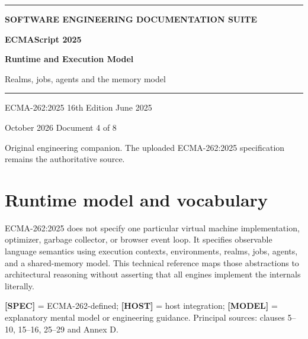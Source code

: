 \documentclass[11pt,letterpaper]{article}
\begin{document}
\hypersetup{pageanchor=false}%
\begin{titlepage}
\thispagestyle{empty}
\vspace*{2.8cm}
{\color{Gold}\rule{18mm}{3pt}}\par\vspace{18mm}
{\sffamily\Large\bfseries\color{Teal} SOFTWARE ENGINEERING DOCUMENTATION SUITE}\par
\vspace{8mm}
{\sffamily\huge\bfseries\color{DeepNavy} ECMAScript 2025 }\par
\vspace{4mm}
{\sffamily\fontsize{24}{29}\selectfont\bfseries\color{DeepNavy} Runtime and Execution Model }\par
\vspace{10mm}
{\large\color{Slate} Realms, jobs, agents and the memory model }\par
\vspace{16mm}
{\color{Teal}\rule{\textwidth}{0.8pt}}\par
\vfill
{\sffamily\color{Slate}\large ECMA-262:2025 \textbullet{} 16th Edition \textbullet{} June 2025}\par
\vspace{3mm}
{\sffamily\color{Slate} October 2026 \textbullet{} Document 4 of 8}\par
\vspace{3mm}
{\small\color{Slate} Original engineering companion. The uploaded ECMA-262:2025 specification remains the authoritative source.}\par
\end{titlepage}\hypersetup{pageanchor=true}
\tableofcontents
\clearpage
\section{Runtime model and vocabulary}\label{runtime-model-and-vocabulary}

ECMA-262:2025 does not specify one particular virtual machine implementation, optimizer, garbage collector, or browser event loop. It specifies observable language semantics using execution contexts, environments, realms, jobs, agents, and a shared-memory model. This technical reference maps those abstractions to architectural reasoning without asserting that all engines implement the internals literally.

\textbf{{[}SPEC{]}} = ECMA-262-defined; \textbf{{[}HOST{]}} = host integration; \textbf{{[}MODEL{]}} = explanatory mental model or engineering guidance. Principal sources: clauses 5--10, 15--16, 25--29 and Annex D.
\end{document}
